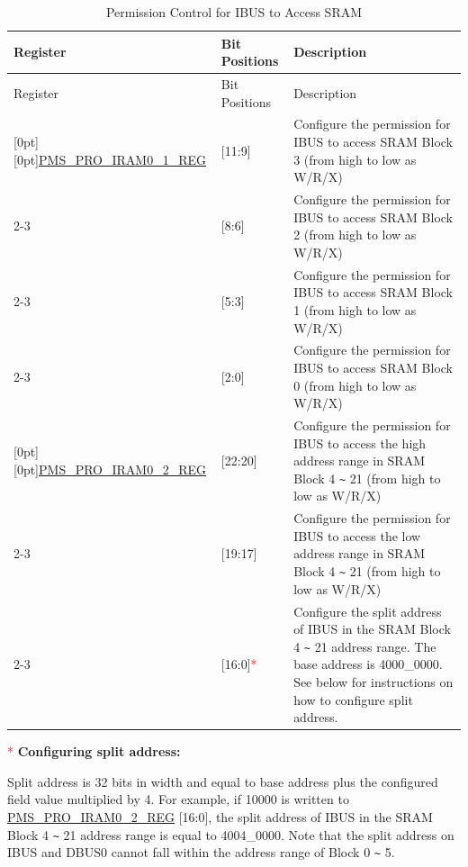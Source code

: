 \documentclass[main\_\_EN.tex]{subfiles}
\begin{document}
\begin{longtable}[h]{|m{4.5cm}|m{2cm}|m{9.5cm}|}
    \caption{Permission Control for IBUS to Access SRAM}
    \label{table:IBUS_Permission Control_for_SRAM}
    \\\hline
    \rowcolor{lightgray}
    Register & Bit Positions & Description \\
    \hline
    \endfirsthead

    \hline
    \rowcolor{lightgray}
    Register & Bit Positions & Description \\
    \hline
    \endhead

    \endfoot

    \hline
    \endlastfoot

    \raisebox{-8ex}[0pt][0pt]{\hyperref[regdesc:PMSPROIRAM01REG]{PMS\_PRO\_IRAM0\_1\_REG}} & [11:9] & Configure the permission for IBUS to access SRAM Block 3 (from high to low as W/R/X) \\
    \cline{2-3}

    & [8:6] & Configure the permission for IBUS to access SRAM Block 2 (from high to low as W/R/X)\\
    \cline{2-3}
    & [5:3] & Configure the permission for IBUS to access SRAM Block 1 (from high to low as W/R/X)\\
    \cline{2-3}
    & [2:0] & Configure the permission for IBUS to access SRAM Block 0 (from high to low as W/R/X)\\
    \hline
    \raisebox{-8ex}[0pt][0pt]{\hyperref[regdesc:PMSPROIRAM02REG]{PMS\_PRO\_IRAM0\_2\_REG}} &  [22:20] & Configure the permission for IBUS to access the high address range in SRAM Block 4 \verb+~+ 21 (from high to low as W/R/X)\\
    \cline{2-3}
    & [19:17] & Configure the permission for IBUS to access the low address range in SRAM Block 4 \verb+~+ 21 (from high to low as W/R/X)\\
    \cline{2-3}
    & [16:0]\textcolor{red}{*} & Configure the split address of IBUS in the SRAM Block 4 \verb+~+ 21 address range. The base address is \hexprefix{}4000\_0000. See below for instructions on how to configure split address.
    \\\hline
\end{longtable}

\begin{tiplisting}
\textcolor{red}{*} {\bfseries Configuring split address:}

Split address is 32 bits in width and equal to base address plus the configured field value multiplied by 4. For example, if \hexprefix{}10000 is written to \hyperref[regdesc:PMSPROIRAM02REG]{PMS\_PRO\_IRAM0\_2\_REG} [16:0], the split address of IBUS in the SRAM Block 4 \verb+~+ 21 address range is equal to \hexprefix{}4004\_0000. Note that the split address on IBUS and DBUS0 cannot fall within the address range of Block 0 \verb+~+ 5.
\end{tiplisting}
\end{document}
